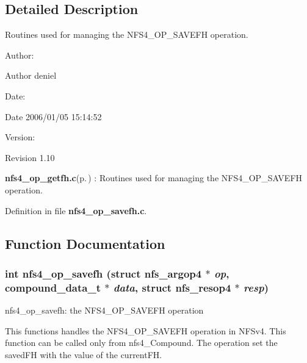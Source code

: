 \subsection{Detailed Description}
Routines used for managing the NFS4\_\-OP\_\-SAVEFH operation. 

\begin{Desc}
\item[Author:]\begin{Desc}
\item[Author]deniel \end{Desc}
\end{Desc}
\begin{Desc}
\item[Date:]\begin{Desc}
\item[Date]2006/01/05 15:14:52 \end{Desc}
\end{Desc}
\begin{Desc}
\item[Version:]\begin{Desc}
\item[Revision]1.10 \end{Desc}
\end{Desc}
{\bf nfs4\_\-op\_\-getfh.c}{\rm (p.\,\pageref{nfs4__op__getfh_8c})} : Routines used for managing the NFS4\_\-OP\_\-SAVEFH operation.

Definition in file {\bf nfs4\_\-op\_\-savefh.c}.

\subsection{Function Documentation}
\subsubsection{\setlength{\rightskip}{0pt plus 5cm}int nfs4\_\-op\_\-savefh (struct nfs\_\-argop4 $\ast$ {\em op}, compound\_\-data\_\-t $\ast$ {\em data}, struct nfs\_\-resop4 $\ast$ {\em resp})}\label{nfs4__op__savefh_8c_a0}


nfs4\_\-op\_\-savefh: the NFS4\_\-OP\_\-SAVEFH operation

This functions handles the NFS4\_\-OP\_\-SAVEFH operation in NFSv4. This function can be called only from nfs4\_\-Compound. The operation set the saved\-FH with the value of the current\-FH.

